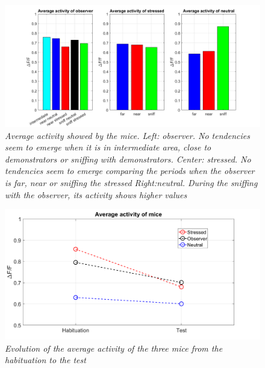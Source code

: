 \documentclass[a4paper]{article}
\begin{document}
\begin{figure}[H]
	
	\begin{center}
		\hspace*{-1.6cm}
		\includegraphics[scale=.42]{activity_barplot.png} 
	\end{center} 
	\caption{\textit{Average activity showed by the mice. Left: observer. No tendencies seem to emerge when it is in intermediate area, close to demonstrators or sniffing with demonstrators. Center: stressed. No tendencies seem to emerge comparing the periods when the observer is far, near or sniffing the stressed Right:neutral. During the sniffing with the observer, its activity shows higher values}}
	
\end{figure}


\begin{figure}[H]
	
	\begin{center}
		
		\includegraphics[scale=.4]{activities.png} 
	\end{center} 
	\caption{\textit{Evolution of the average activity of the three mice from the habituation to the test}}
	
\end{figure}
\end{document}
